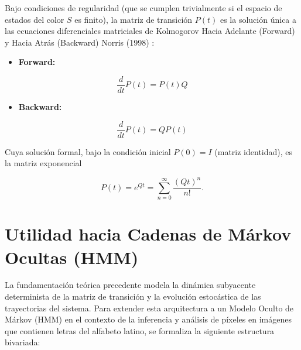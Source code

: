 \documentclass[
  spanish,
  us-letterpaper,
  DIV=11,
  numbers=noendperiod]{scrreprt}
\providecommand{\tightlist}{%
  \setlength{\itemsep}{0pt}\setlength{\parskip}{0pt}}
\newcounter{quartocalloutimpno}
\newcommand{\quartocalloutimp}[1]{\refstepcounter{quartocalloutimpno}\label{#1}}
\begin{document}
\begin{tcolorbox}[enhanced jigsaw, coltitle=black, arc=.35mm, toptitle=1mm, bottomrule=.15mm, rightrule=.15mm, toprule=.15mm, colframe=quarto-callout-important-color-frame, colback=white, bottomtitle=1mm, title=\textcolor{quarto-callout-important-color}{\faExclamation}\hspace{0.5em}{Importante \ref*{imp-ecuaciones-dif-kolmogorov}: Propiedad (Ecuaciones Diferenciales de Kolmogorov)}, titlerule=0mm, leftrule=.75mm, left=2mm, opacitybacktitle=0.6, opacityback=0, colbacktitle=quarto-callout-important-color!10!white, breakable]

\quartocalloutimp{imp-ecuaciones-dif-kolmogorov} 

Bajo condiciones de regularidad (que se cumplen trivialmente si el
espacio de estados del color \(S\) es finito), la matriz de transición
\(P(t)\) es la solución única a las ecuaciones diferenciales matriciales
de Kolmogorov Hacia Adelante (Forward) y Hacia Atrás (Backward) Norris
(1998) :

\begin{itemize}
\tightlist
\item
  \textbf{Forward:}
\end{itemize}

\[
\frac{d}{dt}P(t)=P(t)Q
\]

\begin{itemize}
\tightlist
\item
  \textbf{Backward:}
\end{itemize}

\[
\frac{d}{dt}P(t)=QP(t)
\]

Cuya solución formal, bajo la condición inicial \(P(0)=I\) (matriz
identidad), es la matriz exponencial

\[
P(t)
=
e^{Qt}
=
\sum_{n=0}^{\infty}
\frac{(Qt)^n}{n!}.
\]

\end{tcolorbox}


\chapter{Utilidad hacia Cadenas de Márkov Ocultas
(HMM)}\label{utilidad-hacia-cadenas-de-muxe1rkov-ocultas-hmm}

La fundamentación teórica precedente modela la dinámica subyacente
determinista de la matriz de transición y la evolución estocástica de
las trayectorias del sistema. Para extender esta arquitectura a un
Modelo Oculto de Márkov (HMM) en el contexto de la inferencia y análisis
de píxeles en imágenes que contienen letras del alfabeto latino, se
formaliza la siguiente estructura bivariada:
\end{document}
